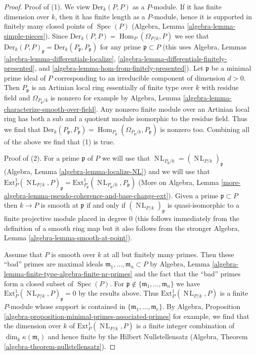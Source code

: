 \documentclass[10pt,a4paper]{amsart}
\theoremstyle{plain}
\theoremstyle{definition}
\theoremstyle{remark}
\numberwithin{equation}{subsection}
\def\Spec{\mathop{\mathrm{Spec}}}
\def\Hom{\mathop{\mathrm{Hom}}\nolimits}
\def\NL{\mathop{N\!L}\nolimits}
\begin{document}
\begin{proof}
Proof of (1). We view $\text{Der}_k(P, P)$ as a $P$-module.
If it has finite dimension over $k$, then it has finite length
as a $P$-module, hence it is supported in finitely many
closed points of $\Spec(P)$
(Algebra, Lemma \ref{algebra-lemma-simple-pieces}).
Since $\text{Der}_k(P, P) = \Hom_P(\Omega_{P/k}, P)$
we see that
$\text{Der}_k(P, P)_\mathfrak p = \text{Der}_k(P_\mathfrak p, P_\mathfrak p)$
for any prime $\mathfrak p \subset P$
(this uses Algebra, Lemmas
\ref{algebra-lemma-differentials-localize},
\ref{algebra-lemma-differentials-finitely-presented}, and
\ref{algebra-lemma-hom-from-finitely-presented}).
Let $\mathfrak p$ be a minimal prime ideal of $P$
corresponding to an irreducible component of dimension $d > 0$.
Then $P_\mathfrak p$ is an Artinian local ring
essentially of finite type over $k$ with residue field
and $\Omega_{P_\mathfrak p/k}$ is nonzero for example by
Algebra, Lemma \ref{algebra-lemma-characterize-smooth-over-field}.
Any nonzero finite module over an Artinian local ring
has both a sub and a quotient module isomorphic to the residue field.
Thus we find that
$\text{Der}_k(P_\mathfrak p, P_\mathfrak p) =
\Hom_{P_\mathfrak p}(\Omega_{P_\mathfrak p/k}, P_\mathfrak p)$
is nonzero too. Combining all of the above we find that (1) is true.

\medskip\noindent
Proof of (2). For a prime $\mathfrak p$ of $P$ we will use that
$\NL_{P_\mathfrak p/k} = (\NL_{P/k})_\mathfrak p$
(Algebra, Lemma \ref{algebra-lemma-localize-NL})
and we will
use that
$\text{Ext}_P^1(\NL_{P/k}, P)_\mathfrak p =
\text{Ext}_{P_\mathfrak p}^1(\NL_{P_\mathfrak p/k}, P_\mathfrak p)$
(More on Algebra, Lemma
\ref{more-algebra-lemma-pseudo-coherence-and-base-change-ext}).
Given a prime $\mathfrak p \subset P$
then $k \to P$ is smooth at $\mathfrak p$ if and only if
$(\NL_{P/k})_\mathfrak p$ is quasi-isomorphic
to a finite projective module placed in degree $0$ (this follows
immediately from the definition of a smooth ring map but it also
follows from the stronger Algebra, Lemma \ref{algebra-lemma-smooth-at-point}).

\medskip\noindent
Assume that $P$ is smooth over $k$ at all but finitely many primes.
Then these ``bad'' primes are maximal ideals
$\mathfrak m_1, \ldots, \mathfrak m_n \subset P$ by
Algebra, Lemma \ref{algebra-lemma-finite-type-algebra-finite-nr-primes}
and the fact that the ``bad'' primes form a closed subset of $\Spec(P)$.
For $\mathfrak p \not \in \{\mathfrak m_1, \ldots, \mathfrak m_n\}$
we have $\text{Ext}^1_P(\NL_{P/k}, P)_\mathfrak p = 0$ by the results above.
Thus $\text{Ext}^1_P(\NL_{P/k}, P)$ is a finite $P$-module
whose support is contained in $\{\mathfrak m_1, \ldots, \mathfrak m_r\}$.
By Algebra, Proposition
\ref{algebra-proposition-minimal-primes-associated-primes}
for example, we find that the dimension over $k$ of
$\text{Ext}^1_P(\NL_{P/k}, P)$ is a finite integer combination
of $\dim_k \kappa(\mathfrak m_i)$ and hence finite by
the Hilbert Nullstellensatz
(Algebra, Theorem \ref{algebra-theorem-nullstellensatz}).
\end{proof}
\end{document}
